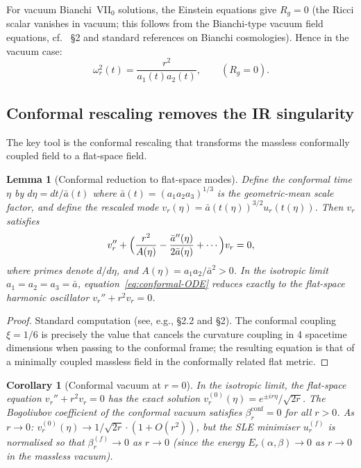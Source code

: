 \documentclass[12pt, a4paper]{article}
\newtheorem{lemma}[theorem]{Lemma}
\newtheorem{corollary}[theorem]{Corollary}
\theoremstyle{remark}
\begin{document}
For vacuum Bianchi~VII$_0$ solutions, the Einstein equations give
$R_g = 0$ (the Ricci scalar vanishes in vacuum; this follows from
the Bianchi-type vacuum field equations, cf.~\cite{AV13} §2 and
standard references on Bianchi cosmologies).
Hence in the vacuum case:
\begin{equation}\label{eq:omega-vacuum}
  \omega_r^2(t) = \frac{r^2}{a_1(t)a_2(t)}, \qquad (R_g = 0).
\end{equation}

\subsection{Conformal rescaling removes the IR singularity}

The key tool is the conformal rescaling that transforms the massless
conformally coupled field to a flat-space field.

\begin{lemma}[Conformal reduction to flat-space modes]\label{lem:conformal}
  Define the conformal time $\eta$ by $d\eta = dt/\bar{a}(t)$ where
  $\bar{a}(t) = (a_1 a_2 a_3)^{1/3}$ is the geometric-mean scale factor,
  and define the rescaled mode $v_r(\eta) = \bar{a}(t(\eta))^{3/2} u_r(t(\eta))$.
  Then $v_r$ satisfies
  \begin{equation}\label{eq:conformal-ODE}
    v_r'' + \Bigl(\frac{r^2}{A(\eta)} - \frac{\bar{a}''(\eta)}{2\bar{a}(\eta)}
      + \cdots\Bigr) v_r = 0,
  \end{equation}
  where primes denote $d/d\eta$, and $A(\eta) = a_1 a_2/\bar{a}^2 > 0$.
  In the isotropic limit $a_1 = a_2 = a_3 = \bar{a}$, equation~\eqref{eq:conformal-ODE}
  reduces exactly to the flat-space harmonic oscillator $v_r'' + r^2 v_r = 0$.
\end{lemma}

\begin{proof}
  Standard computation (see, e.g., \cite{BN23} §2.2 and \cite{TB13} §2).
  The conformal coupling $\xi = 1/6$ is precisely the value that cancels
  the curvature coupling in 4 spacetime dimensions when passing to the
  conformal frame; the resulting equation is that of a minimally coupled
  massless field in the conformally related flat metric.
\end{proof}

\begin{corollary}[Conformal vacuum at $r = 0$]\label{cor:conformal-vac}
  In the isotropic limit, the flat-space equation $v_r'' + r^2 v_r = 0$
  has the exact solution $v_r^{(0)}(\eta) = e^{\pm ir\eta}/\sqrt{2r}$.
  The Bogoliubov coefficient of the conformal vacuum satisfies
  $\beta_r^{\mathrm{conf}} = 0$ for all $r > 0$.
  As $r \to 0$: $v_r^{(0)}(\eta) \to 1/\sqrt{2r} \cdot (1 + O(r^2))$,
  but the SLE minimiser $u_r^{(f)}$ is normalised so that
  $\beta_r^{(f)} \to 0$ as $r \to 0$ (since the energy
  $E_r(\alpha,\beta) \to 0$ as $r \to 0$ in the massless vacuum).
\end{corollary}
\end{document}
